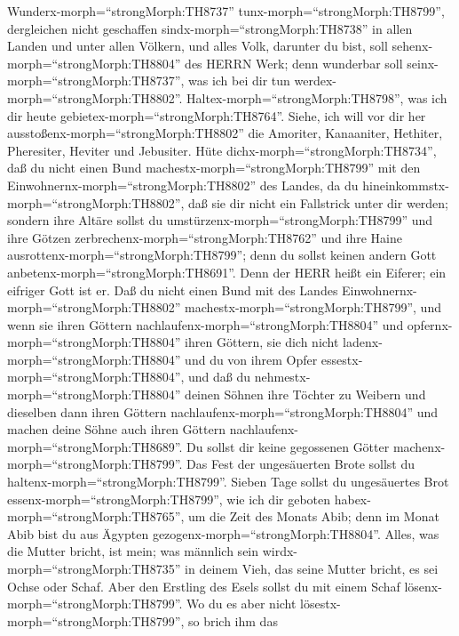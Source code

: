Wunderx-morph=``strongMorph:TH8737'' tunx-morph=``strongMorph:TH8799'',
dergleichen nicht geschaffen sindx-morph=``strongMorph:TH8738'' in allen
Landen und unter allen Völkern, und alles Volk, darunter du bist, soll
sehenx-morph=``strongMorph:TH8804'' des HERRN Werk; denn wunderbar soll
seinx-morph=``strongMorph:TH8737'', was ich bei dir tun
werdex-morph=``strongMorph:TH8802''. 
Haltex-morph=``strongMorph:TH8798'', was ich dir heute
gebietex-morph=``strongMorph:TH8764''. Siehe, ich will vor dir her
ausstoßenx-morph=``strongMorph:TH8802'' die Amoriter, Kanaaniter,
Hethiter, Pheresiter, Heviter und Jebusiter.  Hüte
dichx-morph=``strongMorph:TH8734'', daß du nicht einen Bund
machestx-morph=``strongMorph:TH8799'' mit den
Einwohnernx-morph=``strongMorph:TH8802'' des Landes, da du
hineinkommstx-morph=``strongMorph:TH8802'', daß sie dir nicht ein
Fallstrick unter dir werden;  sondern ihre Altäre sollst du
umstürzenx-morph=``strongMorph:TH8799'' und ihre Götzen
zerbrechenx-morph=``strongMorph:TH8762'' und ihre Haine
ausrottenx-morph=``strongMorph:TH8799'';  denn du sollst
keinen andern Gott anbetenx-morph=``strongMorph:TH8691''. Denn der HERR
heißt ein Eiferer; ein eifriger Gott ist er.  Daß du nicht
einen Bund mit des Landes Einwohnernx-morph=``strongMorph:TH8802''
machestx-morph=``strongMorph:TH8799'', und wenn sie ihren Göttern
nachlaufenx-morph=``strongMorph:TH8804'' und
opfernx-morph=``strongMorph:TH8804'' ihren Göttern, sie dich nicht
ladenx-morph=``strongMorph:TH8804'' und du von ihrem Opfer
essestx-morph=``strongMorph:TH8804'',  und daß du
nehmestx-morph=``strongMorph:TH8804'' deinen Söhnen ihre Töchter zu
Weibern und dieselben dann ihren Göttern
nachlaufenx-morph=``strongMorph:TH8804'' und machen deine Söhne auch
ihren Göttern nachlaufenx-morph=``strongMorph:TH8689''.  Du
sollst dir keine gegossenen Götter machenx-morph=``strongMorph:TH8799''.
 Das Fest der ungesäuerten Brote sollst du
haltenx-morph=``strongMorph:TH8799''. Sieben Tage sollst du ungesäuertes
Brot essenx-morph=``strongMorph:TH8799'', wie ich dir geboten
habex-morph=``strongMorph:TH8765'', um die Zeit des Monats Abib; denn im
Monat Abib bist du aus Ägypten gezogenx-morph=``strongMorph:TH8804''.
 Alles, was die Mutter bricht, ist mein; was männlich sein
wirdx-morph=``strongMorph:TH8735'' in deinem Vieh, das seine Mutter
bricht, es sei Ochse oder Schaf.  Aber den Erstling des
Esels sollst du mit einem Schaf lösenx-morph=``strongMorph:TH8799''. Wo
du es aber nicht lösestx-morph=``strongMorph:TH8799'', so brich ihm das

